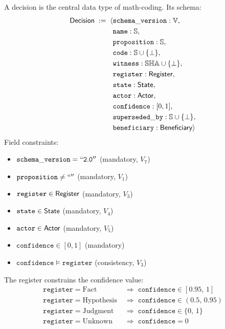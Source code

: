 \begin{definition}[Decision]
A decision is the central data type of math-coding. Its schema:
\begin{align*}
\mathsf{Decision} \;:=\; \langle
& \mathtt{schema\_version} : \mathbb{V}, \\
& \mathtt{name}            : \mathbb{S}, \\
& \mathtt{proposition}     : \mathbb{S}, \\
& \mathtt{code}            : \mathbb{S} \cup \{\bot\}, \\
& \mathtt{witness}         : \mathbb{SHA} \cup \{\bot\}, \\
& \mathtt{register}        : \mathsf{Register}, \\
& \mathtt{state}           : \mathsf{State}, \\
& \mathtt{actor}           : \mathsf{Actor}, \\
& \mathtt{confidence}      : [0, 1], \\
& \mathtt{superseded\_by}  : \mathbb{S} \cup \{\bot\}, \\
& \mathtt{beneficiary}     : \mathsf{Beneficiary}
\rangle
\end{align*}
Field constraints:
\begin{itemize}
\item $\mathtt{schema\_version} = \mathtt{``2.0''}$ (mandatory, $V_7$)
\item $\mathtt{proposition} \neq \mathtt{``''}$ (mandatory, $V_1$)
\item $\mathtt{register} \in \mathsf{Register}$ (mandatory, $V_3$)
\item $\mathtt{state} \in \mathsf{State}$ (mandatory, $V_4$)
\item $\mathtt{actor} \in \mathsf{Actor}$ (mandatory, $V_5$)
\item $\mathtt{confidence} \in [0, 1]$ (mandatory)
\item $\mathtt{confidence} \models \mathtt{register}$ (consistency, $V_3$)
\end{itemize}
\end{definition}

\begin{definition}
The register constrains the confidence value:
\begin{align*}
\mathtt{register} = \mathrm{Fact}       &\;\Rightarrow\; \mathtt{confidence} \in [0.95,\, 1] \\
\mathtt{register} = \mathrm{Hypothesis} &\;\Rightarrow\; \mathtt{confidence} \in (0.5,\, 0.95) \\
\mathtt{register} = \mathrm{Judgment}   &\;\Rightarrow\; \mathtt{confidence} \in \{0,\, 1\} \\
\mathtt{register} = \mathrm{Unknown}    &\;\Rightarrow\; \mathtt{confidence} = 0
\end{align*}
\end{definition}

